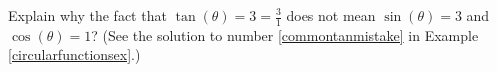 {Explain why the fact that $\tan(\theta) = 3 = \frac{3}{1}$ does not mean $\sin(\theta) = 3$ and $\cos(\theta) = 1$?  (See the solution to number \ref{commontanmistake} in Example \ref{circularfunctionsex}.)}
{}
